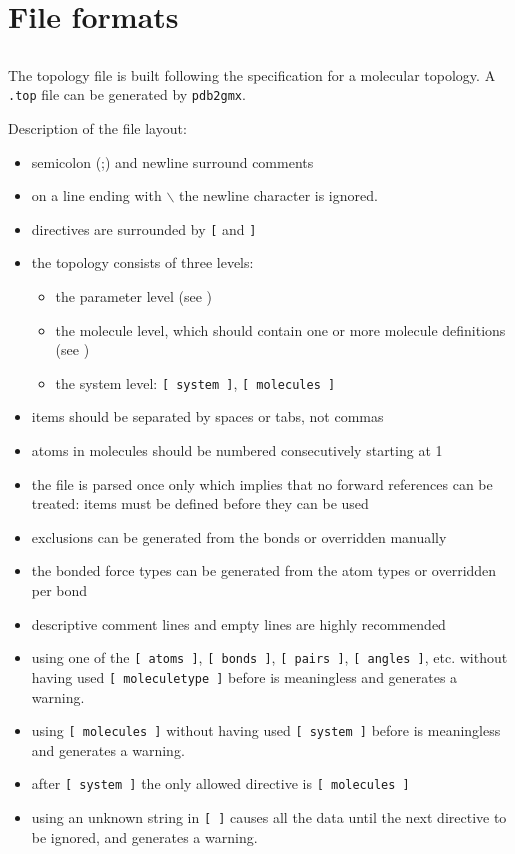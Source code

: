 \section{File formats}
\subsection{}
\label{subsec:topfile}
The topology file is built following the {\gromacs} specification for a
molecular topology.  A {\tt *.top} file can be generated by
{\tt pdb2gmx}.

Description of the file layout:
\begin{itemize}
\item semicolon (;) and newline surround comments
\item on a line ending with $\backslash$ the newline character is ignored.
\item directives are surrounded by {\tt [} and {\tt ]}
\item the topology consists of three levels:
\begin{itemize}
\item the parameter level (see )
\item the molecule level, which should contain one or more molecule
      definitions (see )
\item the system level: {\tt [~system~]}, {\tt [~molecules~]}
\end{itemize}
\item items should be separated by spaces or tabs, not commas
\item atoms in molecules should be numbered consecutively starting at 1
\item the file is parsed once only which implies that no forward
      references can be treated: items must be defined before they
      can be used
\item exclusions can be generated from the bonds or
      overridden manually
\item the bonded force types can be generated from the atom types or
      overridden per bond
\item descriptive comment lines and empty lines are highly recommended
\item using one of the {\tt [~atoms~]}, {\tt [~bonds~]}, 
      {\tt [~pairs~]}, {\tt [~angles~]}, etc. without having used 
      {\tt [~moleculetype~]} 
      before is meaningless and generates a warning.
\item using {\tt [~molecules~]} without having used
      {\tt [~system~]} before is meaningless and generates a warning.
\item after {\tt [~system~]} the only allowed directive is {\tt [~molecules~]}
\item using an unknown string in {\tt [~]} causes all the data until
      the next directive to be ignored, and generates a warning.
\end{itemize}

